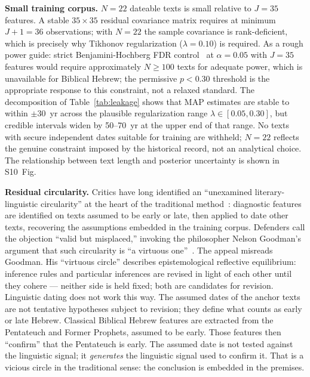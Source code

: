 \documentclass[10pt,letterpaper]{article}
\begin{document}
\textbf{Small training corpus.}  $N = 22$ dateable texts is small relative
to $J = 35$ features.  A stable $35 \times 35$ residual covariance
matrix requires at minimum $J + 1 = 36$ observations; with $N = 22$ the
sample covariance is rank-deficient, which is precisely why Tikhonov
regularization ($\lambda = 0.10$) is required.  As a rough power guide:
strict Benjamini-Hochberg FDR control~\cite{Benjamini1995} at $\alpha = 0.05$ with $J = 35$
features would require approximately $N \geq 100$ texts for adequate
power, which is unavailable for Biblical Hebrew; the permissive $p < 0.30$
threshold is the appropriate response to this constraint, not a relaxed
standard.  The decomposition of Table~\ref{tab:leakage}
shows that MAP estimates are stable to within $\pm 30$~yr across the
plausible regularization range $\lambda \in [0.05, 0.30]$, but credible
intervals widen by 50--70~yr at the upper end of that range.  No texts
with secure independent dates suitable for training are withheld; $N = 22$
reflects the genuine constraint imposed by the historical record, not an
analytical choice.  The relationship between text length and posterior
uncertainty is shown in S10~Fig.

\textbf{Residual circularity.}  Critics have long identified an
``unexamined literary-linguistic circularity'' at the heart of the
traditional method~\cite{Young2003,Young2008,Rezetko2014}: diagnostic
features are identified on texts assumed to be early or late, then
applied to date other texts, recovering the assumptions embedded in the
training corpus.  Defenders call the objection ``valid but misplaced,''
invoking the philosopher Nelson Goodman's argument that such circularity
is ``a virtuous one''~\cite{Hendel2018}.  The appeal misreads Goodman.
His ``virtuous circle'' describes epistemological reflective equilibrium:
inference rules and particular inferences are revised in light of each
other until they cohere --- neither side is held fixed; both are
candidates for revision.  Linguistic dating does not work this way.  The
assumed dates of the anchor texts are not tentative hypotheses subject to
revision; they define what counts as early or late Hebrew.  Classical
Biblical Hebrew features are extracted from the Pentateuch and Former
Prophets, assumed to be early.  Those features then ``confirm'' that the
Pentateuch is early.  The assumed date is not tested against the
linguistic signal; it \emph{generates} the linguistic signal used to
confirm it.  That is a vicious circle in the traditional sense: the
conclusion is embedded in the premises.
\end{document}
